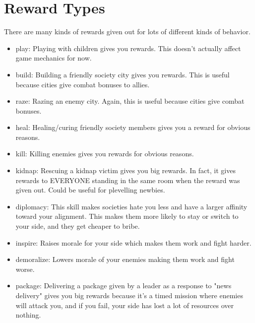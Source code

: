 \section{Reward Types}

There are many kinds of rewards given out for lots of different kinds of
behavior. 

\begin{itemize}

\item play: Playing with children gives you rewards. This doesn't actually
  affect game mechanics for now.

\item build: Building a friendly society city gives you rewards. This is
  useful because cities give combat bonuses to allies.

\item raze: Razing an enemy city. Again, this is useful because cities give
  combat bonuses.

\item heal: Healing/curing friendly society members gives you a reward for
  obvious reasons.

\item kill: Killing enemies gives you rewards for obvious reasons.

\item kidnap: Rescuing a kidnap victim gives you big rewards. In fact, it
  gives rewards to EVERYONE standing in the same room when the reward was
  given out. Could be useful for plevelling newbies.

\item diplomacy: This skill makes societies hate you less and have a larger
  affinity toward your alignment. This makes them more likely to stay or
  switch to your side, and they get cheaper to bribe.

\item inspire: Raises morale for your side which makes them work and fight
  harder.

\item demoralize: Lowers morale of your enemies making them work and fight
  worse.

\item package: Delivering a package given by a leader as a response to "news
  delivery" gives you big rewards because it's a timed mission where enemies
  will attack you, and if you fail, your side has lost a lot of resources over
  nothing.

\end{itemize}
